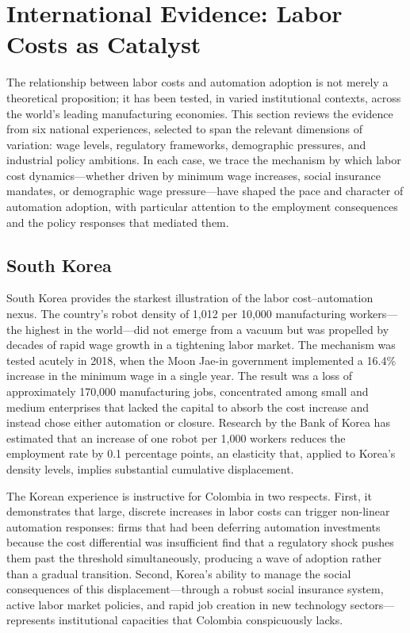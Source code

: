 \documentclass{article}
\begin{document}
\section{International Evidence: Labor Costs as Catalyst}
\label{sec:international}

The relationship between labor costs and automation adoption is not merely a theoretical proposition; it has been tested, in varied institutional contexts, across the world's leading manufacturing economies. This section reviews the evidence from six national experiences, selected to span the relevant dimensions of variation: wage levels, regulatory frameworks, demographic pressures, and industrial policy ambitions. In each case, we trace the mechanism by which labor cost dynamics---whether driven by minimum wage increases, social insurance mandates, or demographic wage pressure---have shaped the pace and character of automation adoption, with particular attention to the employment consequences and the policy responses that mediated them.

\subsection{South Korea}
\label{subsec:korea}

South Korea provides the starkest illustration of the labor cost--automation nexus. The country's robot density of 1,012 per 10,000 manufacturing workers---the highest in the world---did not emerge from a vacuum but was propelled by decades of rapid wage growth in a tightening labor market. The mechanism was tested acutely in 2018, when the Moon Jae-in government implemented a 16.4\% increase in the minimum wage in a single year. The result was a loss of approximately 170,000 manufacturing jobs, concentrated among small and medium enterprises that lacked the capital to absorb the cost increase and instead chose either automation or closure. Research by the Bank of Korea has estimated that an increase of one robot per 1,000 workers reduces the employment rate by 0.1 percentage points, an elasticity that, applied to Korea's density levels, implies substantial cumulative displacement.

The Korean experience is instructive for Colombia in two respects. First, it demonstrates that large, discrete increases in labor costs can trigger non-linear automation responses: firms that had been deferring automation investments because the cost differential was insufficient find that a regulatory shock pushes them past the threshold simultaneously, producing a wave of adoption rather than a gradual transition. Second, Korea's ability to manage the social consequences of this displacement---through a robust social insurance system, active labor market policies, and rapid job creation in new technology sectors---represents institutional capacities that Colombia conspicuously lacks.
\end{document}
